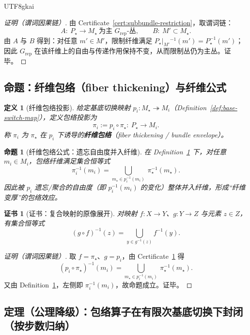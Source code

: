 \documentclass[12pt]{article}
\newtheorem{definition}{定义}[section]
\newtheorem{proposition}{命题}[section]
\newtheorem{certificate}{证书}[section]
\begin{document}
\begin{CJK*}{UTF8}{gkai}
\begin{proof}[证明（谓词因果链）]
由 Certificate~\ref{cert:subbundle-restriction}，取谓词链：
\[
A:\ P_\star\to M_\star\ \text{为主 }G_{\mathrm{rep}}\text{-丛},\qquad
B:\ M'\subset M_\star.
\]
由 $A$ 与 $B$ 得到：对任意 $m'\in M'$，限制纤维满足 $P_\star|_{M'}{}^{-1}(m')=P_\star^{-1}(m')$；
因此 $G_{\mathrm{rep}}$ 在该纤维上的自由与传递作用保持不变，从而限制丛仍为主丛。证毕。
\end{proof}

\subsection{命题：纤维包络（fiber thickening）与纤维公式}

\begin{definition}[纤维包络投影]
\label{def:bundle-envelope}
给定基底切换映射 $p_i:M_\star\twoheadrightarrow M_i$（Definition~\ref{def:base-switch-map}），定义包络投影为
\[
\pi_i:=p_i\circ \pi_\star:\ P_\star\to M_i.
\]
称 $\pi_i$ 为 $\pi_\star$ 在 $p_i$ 下诱导的\textbf{纤维包络}（fiber thickening / bundle envelope）。
\end{definition}

\begin{proposition}[纤维包络公式：遗忘自由度并入纤维]
\label{prop:envelope-fiber-formula}
在 Definition~\ref{def:bundle-envelope} 下，对任意 $m_i\in M_i$，包络纤维满足集合恒等式
\[
\pi_i^{-1}(m_i)
=
\bigcup_{m_\star\in p_i^{-1}(m_i)}\ \pi_\star^{-1}(m_\star).
\]
因此被 $p_i$ 遗忘/聚合的自由度（即 $p_i^{-1}(m_i)$ 的变化）整体并入纤维，形成“纤维变厚”的包络效应。
\end{proposition}

\begin{certificate}[证书：复合映射的原像展开]
\label{cert:envelope-fiber-formula}
对映射 $f:X\to Y$、$g:Y\to Z$ 与元素 $z\in Z$，有集合恒等式
\[
(g\circ f)^{-1}(z)=\bigcup_{y\in g^{-1}(z)} f^{-1}(y).
\]
\end{certificate}

\begin{proof}[证明（谓词因果链）]
取 $f=\pi_\star$、$g=p_i$，由 Certificate~\ref{cert:envelope-fiber-formula} 得
\[
(p_i\circ\pi_\star)^{-1}(m_i)
=
\bigcup_{m_\star\in p_i^{-1}(m_i)}\ \pi_\star^{-1}(m_\star).
\]
又由 Definition~\ref{def:bundle-envelope}，左侧即 $\pi_i^{-1}(m_i)$，故命题成立。证毕。
\end{proof}

\subsection{定理（公理降级）：包络算子在有限次基底切换下封闭（按步数归纳）}


\end{CJK*}
\end{document}
